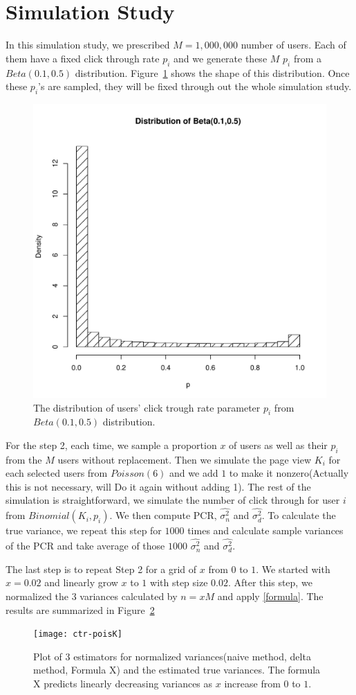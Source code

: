 \documentclass[12pt,letterpaper]{article}
\newcommand{\wht}{\widehat}
\newcommand{\naiveest}{\wht{\sigma^2_n}}
\newcommand{\deltaest}{\wht{\sigma^2_d}}
\begin{document}
\section{Simulation Study}\label{simstudy}
In this simulation study, we prescribed $M=1,000,000$ number of users. Each of them have a fixed click through rate $p_i$ and we generate these $M$ $p_i$ from a $Beta(0.1,0.5)$ distribution. Figure~\ref{fig:beta-dist} shows the shape of this distribution. Once these $p_i$'s are sampled, they will be fixed through out the whole simulation study. 
\begin{figure}[!hbtp]
  \centering
  \includegraphics[width=.5\textwidth]{beta-dist}
  \caption{The distribution of users' click trough rate parameter $p_i$ from $Beta(0.1,0.5)$ distribution.}
  \label{fig:beta-dist}
\end{figure}
For the step 2,  each time, we sample a proportion $x$ of users as well as their $p_i$ from the $M$ users without replacement. Then we simulate the page view $K_i$ for each selected users from 
$Poisson(6)$ and we add $1$ to make it nonzero(Actually this is not necessary, will Do it again without adding 1). The rest of the simulation is straightforward, we simulate the number of click through for user $i$ from $Binomial(K_i,p_i)$. We then compute PCR, $\naiveest$ and $\deltaest$. To calculate the true variance, we repeat this step for $1000$ times and calculate sample variances of the PCR and take average of those $1000$ $\naiveest$ and $\deltaest$. 

The last step is to repeat Step 2 for a grid of $x$ from $0$ to $1$. We started with $x=0.02$ and linearly grow $x$ to $1$ with step size $0.02$. After this step, we normalized the 3 variances calculated by $n = xM$ and apply \eqref{formula}. The results are summarized in Figure~\ref{fig:ctr-poisK} 

\begin{figure}[!hbtp]
  \centering
  \texttt{[image: ctr-poisK]}
  \caption{Plot of 3 estimators for normalized variances(naive method, delta method, Formula X) and the estimated true variances. The formula X predicts linearly decreasing variances as $x$ increase from $0$ to $1$.}
  \label{fig:ctr-poisK}
\end{figure}
\end{document}
